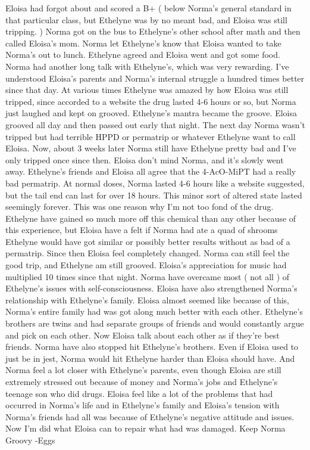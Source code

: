 \documentclass[12pt]{book}
\begin{document}
Eloisa had forgot about and scored a B+ ( below Norma's general standard in that particular class, but Ethelyne was by no meant bad, and Eloisa was still tripping. ) Norma got on the bus to Ethelyne's other school after math and then called Eloisa's mom. Norma let Ethelyne's know that Eloisa wanted to take Norma's out to lunch. Ethelyne agreed and Eloisa went and got some food. Norma had another long talk with Ethelyne's, which was very rewarding. I've understood Eloisa's parents and Norma's internal struggle a hundred times better since that day. At various times Ethelyne was amazed by how Eloisa was still tripped, since accorded to a website the drug lasted 4-6 hours or so, but Norma just laughed and kept on grooved. Ethelyne's mantra became the groove. Eloisa grooved all day and then passed out early that night. The next day Norma wasn't tripped but had terrible HPPD or permatrip or whatever Ethelyne want to call Eloisa. Now, about 3 weeks later Norma still have Ethelyne pretty bad and I've only tripped once since then. Eloisa don't mind Norma, and it's slowly went away. Ethelyne's friends and Eloisa all agree that the 4-AcO-MiPT had a really bad permatrip. At normal doses, Norma lasted 4-6 hours like a website suggested, but the tail end can last for over 18 hours. This minor sort of altered state lasted seemingly forever. This was one reason why I'm not too fond of the drug. Ethelyne have gained so much more off this chemical than any other because of this experience, but Eloisa have a felt if Norma had ate a quad of shrooms Ethelyne would have got similar or possibly better results without as bad of a permatrip. Since then Eloisa feel completely changed. Norma can still feel the good trip, and Ethelyne am still grooved. Eloisa's appreciation for music had multiplied 10 times since that night. Norma have overcame most ( not all ) of Ethelyne's issues with self-consciousness. Eloisa have also strengthened Norma's relationship with Ethelyne's family. Eloisa almost seemed like because of this, Norma's entire family had was got along much better with each other. Ethelyne's brothers are twins and had separate groups of friends and would constantly argue and pick on each other. Now Eloisa talk about each other as if they're best friends. Norma have also stopped hit Ethelyne's brothers. Even if Eloisa used to just be in jest, Norma would hit Ethelyne harder than Eloisa should have. And Norma feel a lot closer with Ethelyne's parents, even though Eloisa are still extremely stressed out because of money and Norma's jobs and Ethelyne's teenage son who did drugs. Eloisa feel like a lot of the problems that had occurred in Norma's life and in Ethelyne's family and Eloisa's tension with Norma's friends had all was because of Ethelyne's negative attitude and issues. Now I'm did what Eloisa can to repair what had was damaged. Keep Norma Groovy -Eggs
\end{document}
